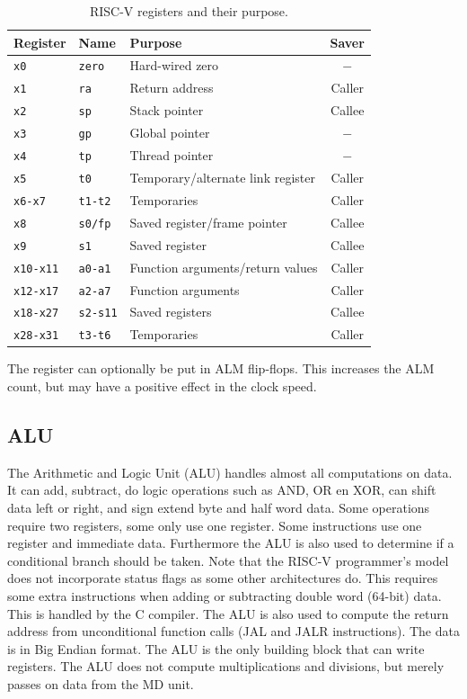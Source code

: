 \documentclass[12pt]{article}
\begin{document}
\begin{table}[!ht]
\centering
\caption{RISC-V registers and their purpose.}
\label{tab:registers}
\begin{tabular}{lllc}
Register & Name & Purpose & Saver \\
\midrule
\texttt{x0}      & \texttt{zero}   & Hard-wired zero                   & $-$ \\
\texttt{x1}      & \texttt{ra}     & Return address                    & Caller \\
\texttt{x2}      & \texttt{sp}     & Stack pointer                     & Callee \\
\texttt{x3}      & \texttt{gp}     & Global pointer                    & $-$ \\
\texttt{x4}      & \texttt{tp}     & Thread pointer                    & $-$ \\
\texttt{x5}      & \texttt{t0}     & Temporary/alternate link register & Caller \\
\texttt{x6-x7}   & \texttt{t1-t2}  & Temporaries                       & Caller \\
\texttt{x8}      & \texttt{s0/fp}  & Saved register/frame pointer      & Callee \\
\texttt{x9}      & \texttt{s1}     & Saved register                    & Callee \\
\texttt{x10-x11} & \texttt{a0-a1}  & Function arguments/return values  & Caller \\
\texttt{x12-x17} & \texttt{a2-a7}  & Function arguments                & Caller \\
\texttt{x18-x27} & \texttt{s2-s11} & Saved registers                   & Callee \\
\texttt{x28-x31} & \texttt{t3-t6}  & Temporaries                       & Caller
\end{tabular}
\end{table}

The register can optionally be put in ALM flip-flops. This increases the ALM count, but may have a positive effect in the clock speed.

\subsection{ALU}
\label{sec:alu}
The Arithmetic and Logic Unit (ALU) handles almost all computations on data. It can add, subtract, do logic operations such as AND, OR en XOR, can shift data left or right, and sign extend byte and half word data. Some operations require two registers, some only use one register. Some instructions use one register and immediate data. Furthermore the ALU is also used to determine if a conditional branch should be taken. Note that the RISC-V programmer's model does not incorporate status flags as some other architectures do. This requires some extra instructions when adding or subtracting double word (64-bit) data. This is handled by the C compiler. The ALU is also used to compute the return address from unconditional function calls (JAL and JALR instructions). The data is in Big Endian format. The ALU is the only building block that can write registers. The ALU does not compute multiplications and divisions, but merely passes on data from the MD unit.
\end{document}
